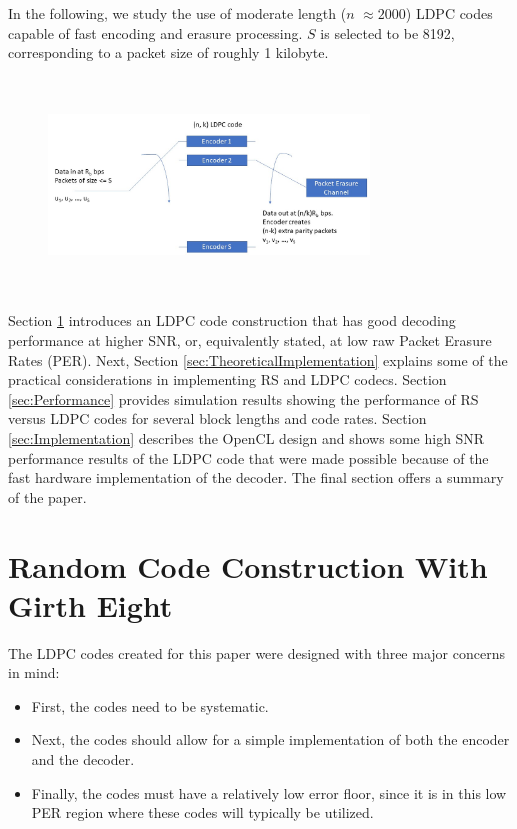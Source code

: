 \documentclass[conference]{IEEEtran}
\begin{document}
In the following, we study the use of moderate length ($n$ $\approx 2000$) LDPC codes capable of fast encoding and erasure processing.  $S$ is selected to be 8192, corresponding to a packet size of roughly 1 kilobyte.

\begin{figure}[htbp]
	\centerline{\includegraphics[height=2.25in, width = 3.35in]{LDPCErasureEncoderFigure_cropped.jpg}}
	\caption{}
	\label{fig:LDPC_erasure_model}
\end{figure}


Section \ref{sec:LDPC_construction} introduces an LDPC code construction that has good decoding performance at higher SNR, or, equivalently stated, at low raw Packet Erasure Rates (PER).  Next, Section \ref{sec:TheoreticalImplementation} explains some of the practical considerations in implementing RS and LDPC codecs.  Section \ref{sec:Performance} provides simulation results showing the performance of RS versus LDPC codes for several block lengths and code rates.  Section \ref{sec:Implementation} describes the OpenCL design and shows some high SNR performance results of the LDPC code that were made possible because of the fast hardware implementation of the decoder.  The final section offers a summary of the paper.

\section{Random Code Construction With Girth Eight}\label{sec:LDPC_construction}


The LDPC codes created for this paper were designed with three major concerns in mind:

\begin{itemize}
	\item First, the codes need to be systematic.
	\item Next, the codes should allow for a simple implementation of both the encoder and the decoder.
	\item Finally, the codes must have a relatively low error floor, since it is in this low PER region where these codes will typically be utilized.
\end{itemize}
\end{document}
